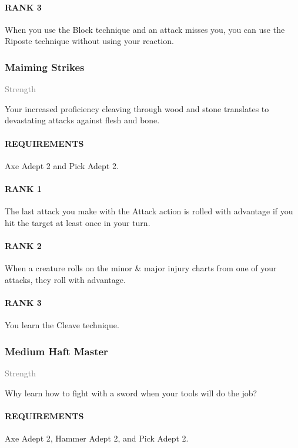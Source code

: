 \paragraph{RANK 3} When you use the Block technique and an attack misses you, you can use the Riposte technique without using your reaction.

\subsubsection{Maiming Strikes} \label{feat::maimingstrikes}
\small{\textcolor{gray}{Strength}}

\normalsize
Your increased proficiency cleaving through wood and stone translates to devastating attacks against flesh and bone.
\paragraph{REQUIREMENTS} Axe Adept 2 and Pick Adept 2.
\paragraph{RANK 1} The last attack you make with the Attack action is rolled with advantage if you hit the target at least once in your turn.
\paragraph{RANK 2} When a creature rolls on the minor \& major injury charts from one of your attacks, they roll with advantage.
\paragraph{RANK 3} You learn the Cleave technique.

\subsubsection{Medium Haft Master} \label{feat::mediumhaftmaster}
\small{\textcolor{gray}{Strength}}

\normalsize
Why learn how to fight with a sword when your tools will do the job?
\paragraph{REQUIREMENTS} Axe Adept 2, Hammer Adept 2, and Pick Adept 2.
